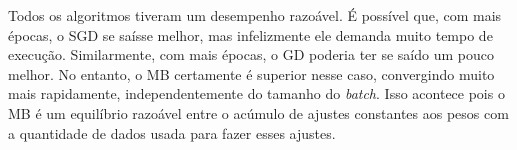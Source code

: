 \documentclass[a4paper]{article}
\begin{document}
Todos os algoritmos tiveram um desempenho razoável. É possível que, com mais épocas, o SGD se saísse melhor, mas infelizmente ele demanda muito tempo de execução. Similarmente, com mais épocas, o GD poderia ter se saído um pouco melhor. No entanto, o MB certamente é superior nesse caso, convergindo muito mais rapidamente, independentemente do tamanho do \textit{batch}. Isso acontece pois o MB é um equilíbrio razoável entre o acúmulo de ajustes constantes aos pesos com a quantidade de dados usada para fazer esses ajustes.
\end{document}
